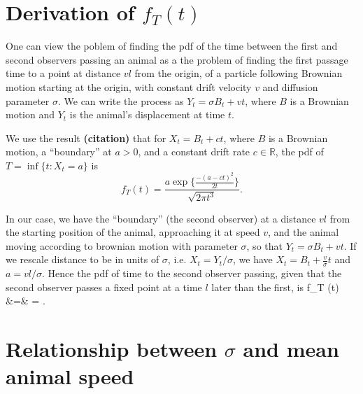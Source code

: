 \documentclass[useAMS, usenatbib, referee]{biom}\usepackage[]{graphicx}\usepackage[]{color}
\begin{document}
\appendix

\section{Derivation of $f_{T}(t)$}
\label{appx:firstpassage}


One can view the poblem of finding the pdf of the time between the first and second observers passing an animal as a the problem of finding the first passage time to a point at distance $vl$ from the origin, of a particle following Brownian motion starting at the origin, with constant drift velocity $v$ and diffusion parameter $\sigma$. We can write the process as $Y_t=\sigma B_t+vt$, where $B$ is a Brownian motion and $Y_t$ is the animal's displacement at time $t$. 


We use the result \textbf{(citation)} that for $X_t=B_t+ct$, where $B$ is a Brownian motion, a ``boundary'' at $a>0$, and a constant drift rate $c\in\mathbb{R}$, the pdf of $T=\inf\{t: X_t=a\}$ is 
\begin{equation}
f_{T} (t) = \frac{ a \exp \Big\{ \frac{- (a-ct)^2}{2t} \Big\} }{\sqrt{2 \pi t^3}}.
\end{equation}

In our case, we have the ``boundary'' (the second observer) at a distance $vl$ from the starting position of the animal, approaching it at speed $v$, and the animal moving according to brownian motion with parameter $\sigma$, so that $Y_t=\sigma B_t+vt$. If we rescale distance to be in units of $\sigma$, i.e. $X_t=Y_t/\sigma$, we have $X_t=B_t+\frac{v}{\sigma}t$ and $a=vl/\sigma$. Hence the pdf of time to the second observer passing, given that the second observer passes a fixed point at a time $l$ later than the first, is
\be
f_{T} (t)
&=&
\;=\;
.
\ee


\section{Relationship between $\sigma$ and mean animal speed}
\label{appx:sigmaspd}
\end{document}
